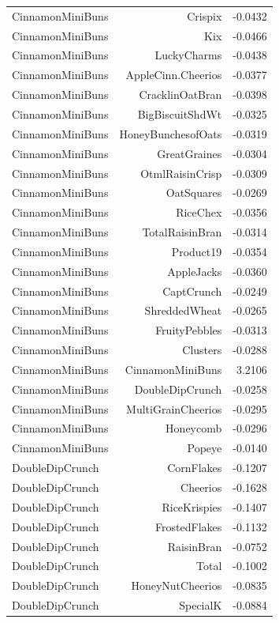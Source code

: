 \begin{longtable}{@{}lrr@{}}
CinnamonMiniBuns & Crispix & -0.0432 \\
CinnamonMiniBuns & Kix & -0.0466 \\
CinnamonMiniBuns & LuckyCharms & -0.0438 \\
CinnamonMiniBuns & AppleCinn.Cheerios & -0.0377 \\
CinnamonMiniBuns & CracklinOatBran & -0.0398 \\
CinnamonMiniBuns & BigBiscuitShdWt & -0.0325 \\
CinnamonMiniBuns & HoneyBunchesofOats & -0.0319 \\
CinnamonMiniBuns & GreatGraines & -0.0304 \\
CinnamonMiniBuns & OtmlRaisinCrisp & -0.0309 \\
CinnamonMiniBuns & OatSquares & -0.0269 \\
CinnamonMiniBuns & RiceChex & -0.0356 \\
CinnamonMiniBuns & TotalRaisinBran & -0.0314 \\
CinnamonMiniBuns & Product19 & -0.0354 \\
CinnamonMiniBuns & AppleJacks & -0.0360 \\
CinnamonMiniBuns & CaptCrunch & -0.0249 \\
CinnamonMiniBuns & ShreddedWheat & -0.0265 \\
CinnamonMiniBuns & FruityPebbles & -0.0313 \\
CinnamonMiniBuns & Clusters & -0.0288 \\
CinnamonMiniBuns & CinnamonMiniBuns & 3.2106 \\
CinnamonMiniBuns & DoubleDipCrunch & -0.0258 \\
CinnamonMiniBuns & MultiGrainCheerios & -0.0295 \\
CinnamonMiniBuns & Honeycomb & -0.0296 \\
CinnamonMiniBuns & Popeye & -0.0140 \\
DoubleDipCrunch & CornFlakes & -0.1207 \\
DoubleDipCrunch & Cheerios & -0.1628 \\
DoubleDipCrunch & RiceKrispies & -0.1407 \\
DoubleDipCrunch & FrostedFlakes & -0.1132 \\
DoubleDipCrunch & RaisinBran & -0.0752 \\
DoubleDipCrunch & Total & -0.1002 \\
DoubleDipCrunch & HoneyNutCheerios & -0.0835 \\
DoubleDipCrunch & SpecialK & -0.0884 \\

\end{longtable}
